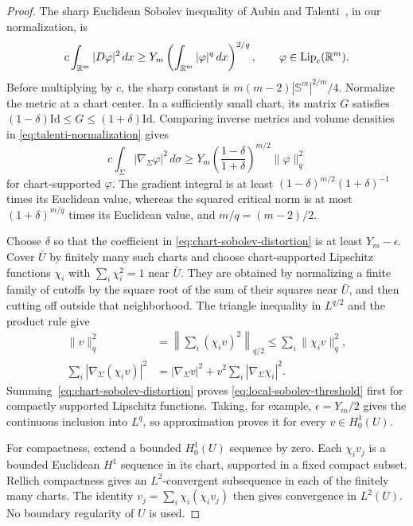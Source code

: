 \begin{proof}
The sharp Euclidean Sobolev inequality of Aubin and
Talenti~\cite{Aubin1976,Talenti1976}, in our normalization, is
\begin{equation}
\label{eq:talenti-normalization}
 c\int_{\mathbb R^m}|D\varphi|^2\,dx
 \ge Y_m\left(\int_{\mathbb R^m}|\varphi|^q\,dx\right)^{2/q},
 \qquad \varphi\in\operatorname{Lip}_c(\mathbb R^m).
\end{equation}
Before multiplying by $c$, the sharp constant is
$m(m-2)|\mathbb S^m|^{2/m}/4$.
Normalize the metric at a chart center. In a sufficiently small chart,
its matrix $G$ satisfies
$(1-\delta)\mathrm{Id}\le G\le(1+\delta)\mathrm{Id}$.
Comparing inverse metrics and volume densities in
\eqref{eq:talenti-normalization} gives
\begin{equation}
\label{eq:chart-sobolev-distortion}
 c\int_\Sigma|\nabla_\Sigma\varphi|^2\,d\sigma
 \ge Y_m\left(\frac{1-\delta}{1+\delta}\right)^{m/2}
          \|\varphi\|_q^2
\end{equation}
for chart-supported $\varphi$. The gradient integral is at least
$(1-\delta)^{m/2}(1+\delta)^{-1}$ times its Euclidean value,
whereas the squared critical norm is at most
$(1+\delta)^{m/q}$ times its Euclidean value, and $m/q=(m-2)/2$.

Choose $\delta$ so that the coefficient in
\eqref{eq:chart-sobolev-distortion} is at least $Y_m-\epsilon$.
Cover $\bar U$ by finitely many such charts and choose chart-supported
Lipschitz functions $\chi_i$ with $\sum_i\chi_i^2=1$ near $\bar U$.
They are obtained by normalizing a finite family of cutoffs by the
square root of the sum of their squares near $\bar U$, and then
cutting off outside that neighborhood. The triangle inequality in
$L^{q/2}$ and the product rule give
\begin{align}
\label{eq:squared-partition-norm}
 \|v\|_q^2
 &=\left\|\sum_i(\chi_i v)^2\right\|_{q/2}
 \le\sum_i\|\chi_i v\|_q^2,\\
\label{eq:squared-partition-energy}
 \sum_i|\nabla_\Sigma(\chi_i v)|^2
 &=|\nabla_\Sigma v|^2
        +v^2\sum_i|\nabla_\Sigma\chi_i|^2.
\end{align}
Summing~\eqref{eq:chart-sobolev-distortion} proves
\eqref{eq:local-sobolev-threshold} first for compactly supported
Lipschitz functions. Taking, for example, $\epsilon=Y_m/2$ gives
the continuous inclusion into $L^q$, so approximation proves it
for every $v\in H^1_0(U)$.

For compactness, extend a bounded $H^1_0(U)$ sequence by zero.
Each $\chi_i v_j$ is a bounded Euclidean $H^1$ sequence in its chart,
supported in a fixed compact subset. Rellich compactness gives an
$L^2$-convergent subsequence in each of the finitely many charts.
The identity $v_j=\sum_i\chi_i(\chi_i v_j)$ then gives convergence
in $L^2(U)$. No boundary regularity of $U$ is used.
\end{proof}

